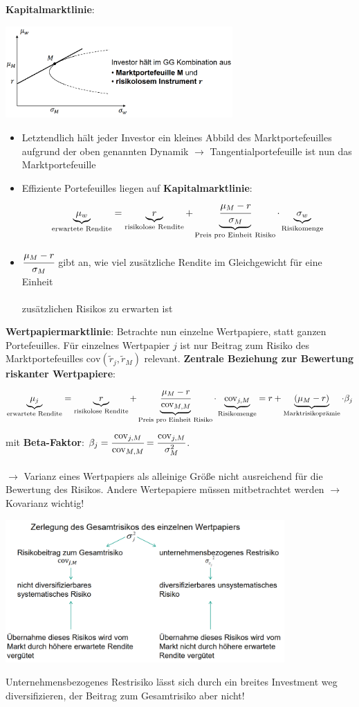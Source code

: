 \pagebreak
\textbf{Kapitalmarktlinie}: 
\begin{center}
	\includegraphics[width=0.65\textwidth]{images/marktpf.png}
\end{center}
\begin{itemize}
	\item Letztendlich hält jeder Investor ein kleines Abbild des Marktportefeuilles aufgrund der oben genannten Dynamik $\rightarrow$ Tangentialportefeuille ist nun das Marktportefeuille
	\item Effiziente Portefeuilles liegen auf \textbf{Kapitalmarktlinie}:
	\[
	\underbrace{\mu_w}_\text{erwartete Rendite}=
	\underbrace{r}_\text{risikolose Rendite} + 
	\underbrace{\cfrac{\mu_M-r}{\sigma_M}}_\text{Preis pro Einheit Risiko}\cdot
	\underbrace{\sigma_w}_\text{Risikomenge}
	\]
	\item $\cfrac{\mu_M-r}{\sigma_M}$ gibt an, wie viel zusätzliche Rendite im Gleichgewicht für eine Einheit\\\\ zusätzlichen Risikos zu erwarten ist
\end{itemize}
\bigskip
\textbf{Wertpapiermarktlinie}: Betrachte nun einzelne Wertpapiere, statt ganzen Portefeuilles.
Für einzelnes Wertpapier $j$ ist nur Beitrag zum Risiko des Marktportefeuilles $\text{cov}(\tilde{r}_j,\tilde{r}_M)$ relevant.
\textbf{Zentrale Beziehung zur Bewertung riskanter Wertpapiere}:
\[
\underbrace{\mu_j}_\text{erwartete Rendite}=
\underbrace{r}_\text{risikolose Rendite} + 
\underbrace{\cfrac{\mu_M-r}{\text{cov}_{M,M}}}_\text{Preis pro Einheit Risiko}\cdot
\underbrace{\text{cov}_{j,M}}_\text{Risikomenge}= r +
\underbrace{(\mu_M-r)}_\text{Marktrisikoprämie}\cdot
\beta_j
\]
mit \textbf{Beta-Faktor}: $\beta_j=\cfrac{\text{cov}_{j,M}}{\text{cov}_{M,M}}=\cfrac{\text{cov}_{j,M}}{\sigma_M^2}$.\\\\
$\rightarrow$ Varianz eines Wertpapiers als alleinige Größe nicht ausreichend für die Bewertung des Risikos. Andere Wertepapiere müssen mitbetrachtet werden $\rightarrow$ Kovarianz wichtig!
\begin{center}
	\includegraphics[width=0.8\textwidth]{images/risk-overview.png}
\end{center}
Unternehmensbezogenes Restrisiko lässt sich durch ein breites Investment weg diversifizieren, der Beitrag zum Gesamtrisiko aber nicht!